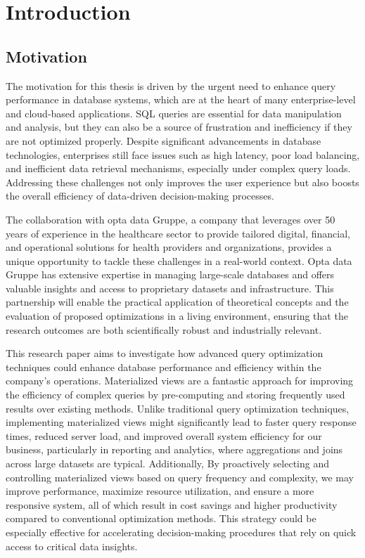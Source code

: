 \section{Introduction}
\subsection{Motivation}
The motivation for this thesis is driven by the urgent need to enhance query performance in database systems, which are at the heart of many enterprise-level and cloud-based applications. SQL queries are essential for data manipulation and analysis, but they can also be a source of frustration and inefficiency if they are not optimized properly. Despite significant advancements in database technologies, enterprises still face issues such as high latency, poor load balancing, and inefficient data retrieval mechanisms, especially under complex query loads. Addressing these challenges not only improves the user experience but also boosts the overall efficiency of data-driven decision-making processes.\vspace{.4cm}

The collaboration with opta data Gruppe, a company that leverages over 50 years of experience in the healthcare sector to provide tailored digital, financial, and operational solutions for health providers and organizations, provides a unique opportunity to tackle these challenges in a real-world context. Opta data Gruppe has extensive expertise in managing large-scale databases and offers valuable insights and access to proprietary datasets and infrastructure. This partnership will enable the practical application of theoretical concepts and the evaluation of proposed optimizations in a living environment, ensuring that the research outcomes are both scientifically robust and industrially relevant.\vspace{.4cm}

This research paper aims to investigate how advanced query optimization techniques could enhance database performance and efficiency within the company's operations. Materialized views are a fantastic approach for improving the efficiency of complex queries by pre-computing and storing frequently used results over existing methods. Unlike traditional query optimization techniques, implementing materialized views might significantly lead to faster query response times, reduced server load, and improved overall system efficiency for our business, particularly in reporting and analytics, where aggregations and joins across large datasets are typical. Additionally, By proactively selecting and controlling materialized views based on query frequency and complexity, we may improve performance, maximize resource utilization, and ensure a more responsive system, all of which result in cost savings and higher productivity compared to conventional optimization methods. This strategy could be especially effective for accelerating decision-making procedures that rely on quick access to critical data insights.\vspace{.4cm}

